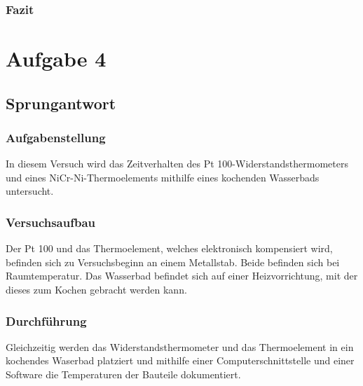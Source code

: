 \documentclass[a4paper,11pt,oneside]{article}
\begin{document}
\subsubsection{Fazit}


\section{Aufgabe 4}
\subsection{Sprungantwort}
\subsubsection{Aufgabenstellung}
In diesem Versuch wird das Zeitverhalten des Pt 100-Widerstandsthermometers und eines NiCr-Ni-Thermoelements mithilfe eines kochenden Wasserbads untersucht. 
\subsubsection{Versuchsaufbau}
Der Pt 100 und das Thermoelement, welches elektronisch kompensiert wird, befinden sich zu Versuchsbeginn an einem Metallstab. Beide befinden sich bei Raumtemperatur. Das Wasserbad befindet sich auf einer Heizvorrichtung, mit der dieses zum Kochen gebracht werden kann. 
\subsubsection{Durchführung}
Gleichzeitig werden das Widerstandsthermometer und das Thermoelement in ein kochendes Waserbad platziert und mithilfe einer Computerschnittstelle und einer Software die Temperaturen der Bauteile dokumentiert. 
\end{document}
